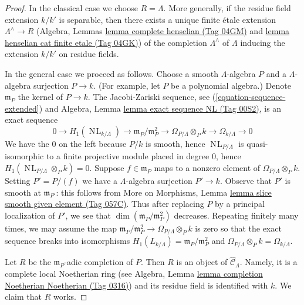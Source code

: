\documentclass{amsart}
\theoremstyle{plain}
\theoremstyle{definition}
\theoremstyle{remark}
\numberwithin{equation}{subsection}
\def\NL{\mathop{N\!L}\nolimits}
\begin{document}
\begin{proof}
In the classical case we choose $R = \Lambda$. More generally, if
the residue field extension $k/k'$ is separable, then there exists
a unique finite \'etale extension $\Lambda^\wedge \to R$
(Algebra, Lemmas \href{https://stacks.math.columbia.edu/tag/04GM}{lemma complete henselian (Tag 04GM)} and
\href{https://stacks.math.columbia.edu/tag/04GK}{lemma henselian cat finite etale (Tag 04GK)})
of the completion $\Lambda^\wedge$ of $\Lambda$
inducing the extension $k/k'$ on residue fields.

\medskip\noindent
In the general case we proceed as follows. Choose a smooth
$\Lambda$-algebra $P$ and a $\Lambda$-algebra surjection $P \to k$.
(For example, let $P$ be a polynomial algebra.)
Denote $\mathfrak m_P$ the kernel of $P \to k$. The Jacobi-Zariski sequence,
see (\ref{equation-sequence-extended}) and 
Algebra, Lemma \href{https://stacks.math.columbia.edu/tag/00S2}{lemma exact sequence NL (Tag 00S2)}, is an
exact sequence
$$
0 \to H_1(\NL_{k/\Lambda}) \to
\mathfrak m_P/\mathfrak m_P^2 \to
\Omega_{P/\Lambda} \otimes_P k \to
\Omega_{k/\Lambda} \to 0
$$
We have the $0$ on the left because $P/k$ is smooth, hence
$\NL_{P/\Lambda}$ is quasi-isomorphic to a finite projective module
placed in degree $0$, hence $H_1(\NL_{P/\Lambda} \otimes_P k) = 0$.
Suppose $f \in \mathfrak m_P$ maps to a nonzero element
of $\Omega_{P/\Lambda} \otimes_P k$. Setting $P' = P/(f)$ we have a
$\Lambda$-algebra surjection $P' \to k$.
Observe that $P'$ is smooth at $\mathfrak m_{P'}$:
this follows from More on Morphisms, Lemma
\href{https://stacks.math.columbia.edu/tag/057C}{lemma slice smooth given element (Tag 057C)}.
Thus after replacing $P$ by a principal localization
of $P'$, we see that $\dim(\mathfrak m_P/\mathfrak m_P^2)$
decreases. Repeating finitely many times, we may assume
the map $\mathfrak m_P/\mathfrak m_P^2 \to
\Omega_{P/\Lambda} \otimes_P k$ is zero so that
the exact sequence breaks into isomorphisms
$H_1(L_{k/\Lambda}) = \mathfrak m_P/\mathfrak m_P^2$ and
$\Omega_{P/\Lambda} \otimes_P k = \Omega_{k/\Lambda}$.

\medskip\noindent
Let $R$ be the $\mathfrak m_P$-adic completion of $P$.
Then $R$ is an object of $\widehat{\mathcal{C}}_\Lambda$.
Namely, it is a complete local Noetherian ring (see
Algebra, Lemma \href{https://stacks.math.columbia.edu/tag/0316}{lemma completion Noetherian Noetherian (Tag 0316)})
and its residue field is identified with $k$.
We claim that $R$ works.


\end{proof}
\end{document}
